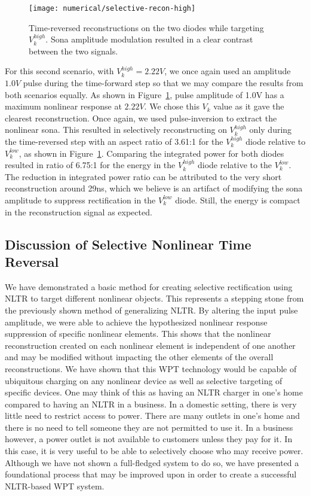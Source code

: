 \begin{figure}[t]
\centering
\texttt{[image: numerical/selective-recon-high]}
\caption[Selective reconstruction on a $V_{k}^{high}$ diode]{Time-reversed reconstructions on the two diodes while targeting $V_{k}^{high}$. Sona amplitude modulation resulted in a clear contrast between the two signals.}
\label{fig:numerical-selective-recon-high}
\end{figure}

For this second scenario, with $V_k^{high} = 2.22V$, we once again used an amplitude $1.0 V$ pulse during the time-forward step so that we may compare the results from both scenarios equally. As shown in Figure~\ref{fig:numerical-selective-recon-high}, pulse amplitude of 1.0V has a maximum nonlinear response at $2.22V$. We chose this $V_k$ value as it gave the clearest reconstruction. Once again, we used pulse-inversion to extract the nonlinear sona. This resulted in selectively reconstructing on $V_k^{high}$ only during the time-reversed step with an aspect ratio of 3.61:1 for the $V_k^{high}$  diode relative to $V_k^{low}$, as shown in Figure~\ref{fig:numerical-selective-recon-high}. Comparing the integrated power for both diodes resulted in ratio of 6.75:1 for the energy in the $V_k^{high}$ diode relative to the $V_k^{low}$. The reduction in integrated power ratio can be attributed to the very short reconstruction around 29ns, which we believe is an artifact of modifying the sona amplitude to suppress rectification in the $V_k^{low}$ diode. Still, the energy is compact in the reconstruction signal as expected.

\subsection{Discussion of Selective Nonlinear Time Reversal}

We have demonstrated a basic method for creating selective rectification using NLTR to target different nonlinear objects. This represents a stepping stone from the previously shown method of generalizing NLTR. By altering the input pulse amplitude, we were able to achieve the hypothesized nonlinear response suppression of specific nonlinear elements. This shows that the nonlinear reconstruction created on each nonlinear element is independent of one another and may be modified without impacting the other elements of the overall reconstructions. We have shown that this WPT technology would be capable of ubiquitous charging on any nonlinear device as well as selective targeting of specific devices. One may think of this as having an NLTR charger in one's home compared to having an NLTR in a business. In a domestic setting, there is very little need to restrict access to power. There are many outlets in one's home and there is no need to tell someone they are not permitted to use it. In a business however, a power outlet is not available to customers unless they pay for it. In this case, it is very useful to be able to selectively choose who may receive power. Although we have not shown a full-fledged system to do so, we have presented a foundational process that may be improved upon in order to create a successful NLTR-based WPT system.

